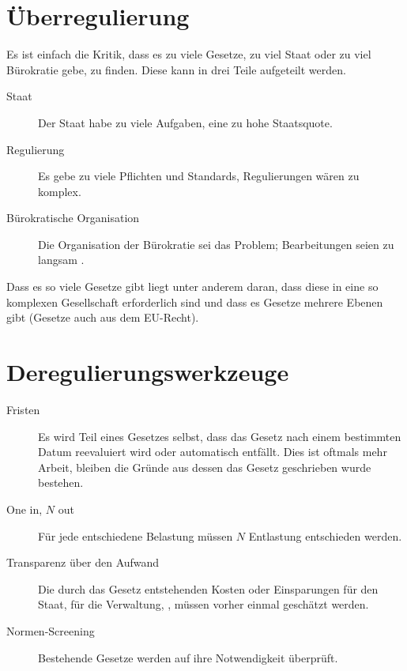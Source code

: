 \documentclass{article}
\begin{document}
\section{Überregulierung} 
Es ist einfach die Kritik, dass es zu viele Gesetze, zu viel Staat oder zu viel Bürokratie gebe, zu finden. Diese kann in drei Teile aufgeteilt werden.
\begin{description}
 \item[Staat] Der Staat habe zu viele Aufgaben, eine zu hohe Staatsquote.
 \item[Regulierung] Es gebe zu viele Pflichten und Standards, Regulierungen wären zu komplex.
 \item[Bürokratische Organisation] Die Organisation der Bürokratie sei das Problem; Bearbeitungen seien zu langsam \etc.
\end{description}
Dass es so viele Gesetze gibt liegt unter anderem daran, dass diese in eine so komplexen Gesellschaft erforderlich sind und dass es Gesetze mehrere Ebenen gibt (\zb Gesetze auch aus dem EU-Recht).

\section{Deregulierungswerkzeuge} 
\begin{description}
 \item[Fristen] Es wird Teil eines Gesetzes selbst, dass das Gesetz nach einem bestimmten Datum reevaluiert wird oder automatisch entfällt. Dies ist oftmals mehr Arbeit, \idr bleiben die Gründe aus dessen das Gesetz geschrieben wurde bestehen.
 \item[One in, $N$ out] Für jede entschiedene Belastung müssen $N$ Entlastung entschieden werden.
 \item[Transparenz über den Aufwand] Die durch das Gesetz entstehenden Kosten oder Einsparungen für den Staat, für die Verwaltung, \etc, müssen vorher einmal geschätzt werden.
 \item[Normen-Screening] Bestehende Gesetze werden auf ihre Notwendigkeit überprüft.
\end{description}
\end{document}
